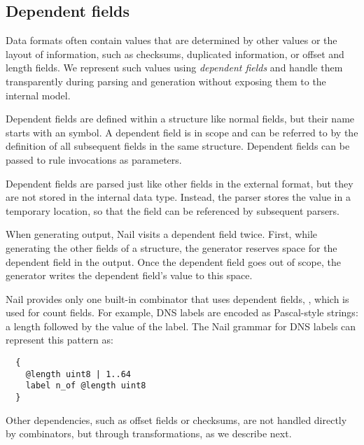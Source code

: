 


\subsection{Dependent fields}
\label{s:dependent}
Data formats often contain values that are determined by other values or the layout of information,
such as checksums, duplicated information, or offset and  length fields.
We represent such values using \emph{dependent fields} and handle them transparently during
parsing and generation without exposing them to the internal model. 


Dependent fields are defined within a structure like normal fields, but their name starts with an  symbol.
A dependent field is in scope and can be referred to by the definition of all subsequent fields in
the same structure. Dependent fields can be passed to rule invocations as parameters.

Dependent fields are parsed just like other fields in the external format, but they are not stored
in the internal data type. Instead, the parser stores the value in a
temporary location, so that the field can be referenced by subsequent parsers.

When generating output, Nail visits a dependent field twice. First, while generating the other fields of a
structure, the generator reserves space for the dependent field in the output. Once
the dependent field goes out of scope, the generator  writes the
dependent field's value to this space.

Nail provides only one built-in combinator that uses dependent fields, , which is used
for count fields. For example, DNS labels are encoded as Pascal-style strings: a length followed by
the value of the label. The Nail grammar for DNS labels can represent
this pattern as:

{
\smaller[0.5]
\begin{verbatim}
  {
    @length uint8 | 1..64
    label n_of @length uint8
  }
\end{verbatim}
}

Other dependencies, such as offset fields or checksums, are not handled directly by combinators, but
through  transformations, as we describe next.

